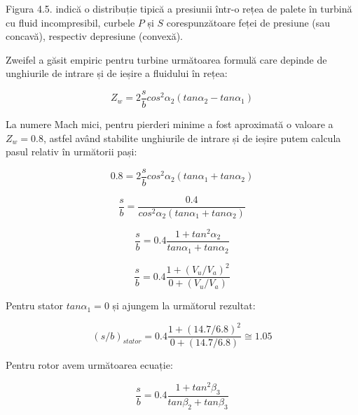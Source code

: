 Figura 4.5. indică o distribuție tipică a presiunii într-o rețea de palete în turbină cu fluid incompresibil, curbele $P$ și $S$ corespunzătoare feței de presiune (sau concavă), respectiv depresiune (convexă).

Zweifel a găsit empiric pentru turbine următoarea formulă care depinde de unghiurile de intrare și de ieșire a fluidului în rețea:

\begin{equation}
Z_w = 2 \frac{s}{b} cos^2\alpha_2 (tan\alpha_2 - tan\alpha_1)
\end{equation}

La numere Mach mici, pentru pierderi minime a fost aproximată o valoare a $Z_w = 0.8$, astfel având stabilite unghiurile de intrare și de ieșire putem calcula pasul relativ în următorii pași:

\begin{equation}
0.8 = 2 \frac{s}{b} cos^2\alpha_2 (tan\alpha_1 + tan\alpha_2)
\end{equation}

\begin{equation}
\frac{s}{b} = \frac{0.4}{cos^2\alpha_2 (tan\alpha_1 + tan\alpha_2)}
\end{equation}

\begin{equation}
\frac{s}{b} = 0.4 \frac{1+tan^2\alpha_2}{tan\alpha_1 + tan\alpha_2}
\end{equation}

\begin{equation}
\frac{s}{b} = 0.4 \frac{1 + (V_u / V_a)^2 } {0 + (V_u / V_a)}
\end{equation}

\vspace{5mm} %

Pentru stator $tan\alpha_1 = 0$ și ajungem la următorul rezultat:

\begin{equation}
(s/b)_{stator} = 0.4 \frac{1 + (14.7 / 6.8)^2 } {0 + (14.7 / 6.8)}\cong 1.05
\end{equation}

\vspace{5mm} %

Pentru rotor avem următoarea ecuație:

\begin{equation}
\frac{s}{b} = 0.4 \frac{1+tan^2\beta_3}{tan\beta_2 + tan\beta_3}
\end{equation}

